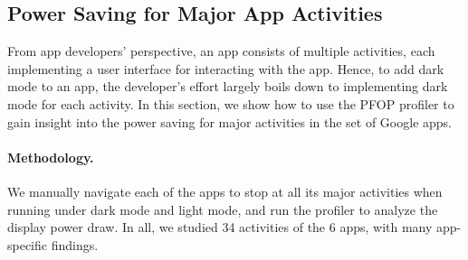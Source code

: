 \subsection{Power Saving for Major App Activities}
\label{subsec:activities}




From app developers' perspective, an app consists of multiple
activities, each implementing a user interface for interacting
with the app. Hence, to add dark mode to an app, the developer's
effort largely boils down to implementing dark mode for each
activity. In this section, we show how to use the PFOP profiler to
gain insight into the power saving for major activities in the set of Google
apps.

\paragraph{Methodology.}
We manually navigate each of the apps to stop at all its major
activities when running under dark mode and light mode, and run
the \name profiler to analyze the display power draw.
In all, we studied 34 activities of the 6 apps, with
many app-specific findings.

